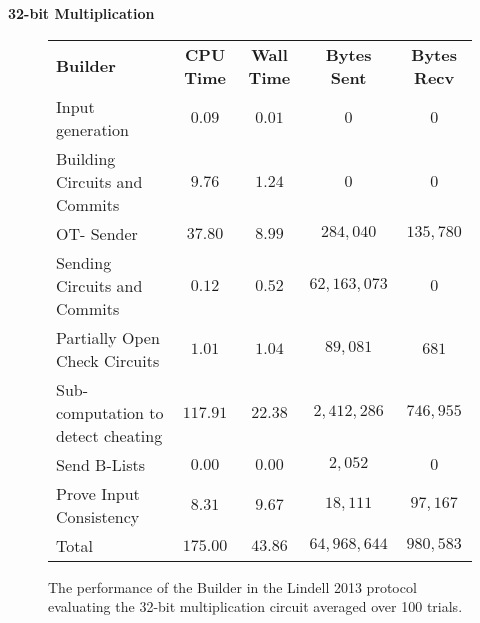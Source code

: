 \documentclass[ %
                    author={Nicholas Tutte},
                supervisor={Prof. Nigel Smart},
                    degree={MEng},
                     title={Secure Two Party Computation},
                  subtitle={A practical comparison of recent protocols},
                      type={Research - GG1K},
                      year={2015} ]{dissertation}
\begin{document}
				\FloatBarrier
				\noindent \textbf{32-bit Multiplication}
				\begin{figure}[!ht]
					\begin{tabular}{| p{4.3cm} | c c c c |}
						\hline
						\textbf{Builder} & \textbf{CPU Time} & \textbf{Wall Time} & \textbf{Bytes Sent} & \textbf{Bytes Recv} \\
						\thickhline
						Input generation & $0.09$ & $0.01$ & $0$ & $0$ \\
						\hline
						Building Circuits and Commits & $9.76$ & $1.24$ & $0$ & $0$ \\
						\hline
						OT- Sender & $37.80$ & $8.99$ & $284,040$ & $135,780$ \\
						\hline
						Sending Circuits and Commits & $0.12$ & $0.52$ & $62,163,073$ & $0$ \\
						\hline
						Partially Open Check Circuits & $1.01$ & $1.04$ & $89,081$ & $681$ \\
						\hline
						Sub-computation to detect cheating & $117.91$ & $22.38$ & $2,412,286$ & $746,955$ \\
						\hline
						Send B-Lists & $0.00$ & $0.00$ & $2,052$ & $0$ \\
						\hline
						Prove Input Consistency & $8.31$ & $9.67$ & $18,111$ & $97,167$ \\
						\thickhline
						Total & $175.00$ & $43.86$ & $64,968,644$ & $980,583$ \\
						\hline
					\end{tabular}
					\caption{The performance of the Builder in the Lindell 2013 protocol evaluating the 32-bit multiplication circuit averaged over 100 trials. \label{table:L_2013_Mul_Builder} }
				\end{figure}
				
\end{document}
